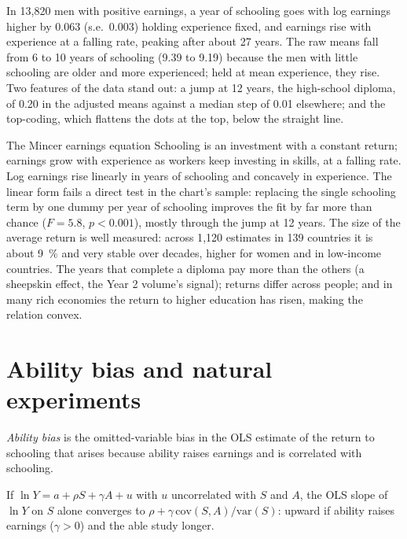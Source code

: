 In 13{,}820 men with positive earnings, a year of schooling goes with log earnings
higher by 0.063 (s.e.\ 0.003) holding experience fixed, and earnings rise with experience
at a falling rate, peaking after about 27 years. The raw means fall from 6 to 10 years
of schooling (9.39 to 9.19) because the men with little schooling are older and more
experienced; held at mean experience, they rise. Two features of the data stand out: a
jump at 12 years, the high-school diploma, of 0.20 in the adjusted means against a
median step of 0.01 elsewhere; and the top-coding, which flattens the dots at the top,
below the straight line.

\begin{model}{The Mincer earnings equation}
\assumes Schooling is an investment with a constant return; earnings grow with
experience as workers keep investing in skills, at a falling rate.
\predicts Log earnings rise linearly in years of schooling and concavely in
experience.
\tested The linear form fails a direct test in the chart's sample: replacing the
single schooling term by one dummy per year of schooling improves the fit by far more
than chance ($F = 5.8$, $p < 0.001$), mostly through the jump at 12 years.
The size of the average return is well measured: across 1{,}120 estimates in 139
countries it is about 9~\% and very stable over decades, higher for women and in
low-income countries. %
\breaks The years that complete a diploma pay more than the others (a sheepskin
effect, the Year 2 volume's signal); returns differ across people; and in many rich
economies the return to higher education has risen, making the relation convex.
\end{model}

\section{Ability bias and natural experiments}\label{sec:b3:human-capital:ability}

\begin{definition}\label{def:b3:human-capital:ability-bias}
\emph{Ability bias} is the omitted-variable bias in the OLS estimate of the return
to schooling that arises because ability raises earnings and is correlated with
schooling.
\end{definition}

\begin{proposition}\label{prop:b3:human-capital:bias}
If $\ln Y = a + \rho S + \gamma A + u$ with $u$ uncorrelated with $S$ and $A$, the OLS slope of $\ln Y$ on $S$ alone converges
to $\rho + \gamma\,\mathrm{cov}(S, A)/\mathrm{var}(S)$: upward if ability raises earnings ($\gamma > 0$) and the able study longer.
\end{proposition}

